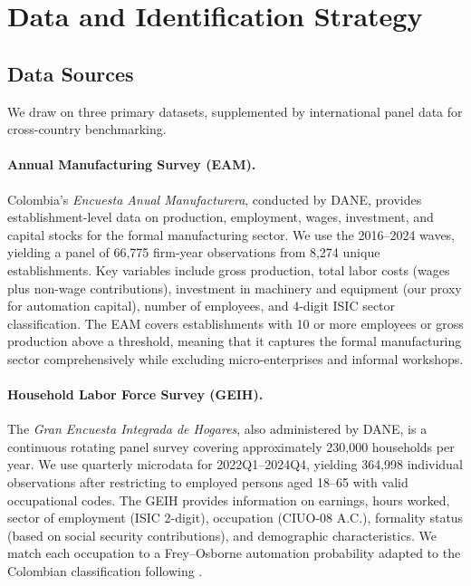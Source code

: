 \documentclass[5p,times,authoryear]{elsarticle}
\begin{document}
\section{Data and Identification Strategy}
\label{sec:data}

\subsection{Data Sources}
\label{subsec:data_sources}

We draw on three primary datasets, supplemented by international panel data for cross-country benchmarking.

\paragraph{Annual Manufacturing Survey (EAM).} Colombia's \textit{Encuesta Anual Manufacturera}, conducted by DANE, provides establishment-level data on production, employment, wages, investment, and capital stocks for the formal manufacturing sector. We use the 2016--2024 waves, yielding a panel of 66,775 firm-year observations from 8,274 unique establishments. Key variables include gross production, total labor costs (wages plus non-wage contributions), investment in machinery and equipment (our proxy for automation capital), number of employees, and 4-digit ISIC sector classification. The EAM covers establishments with 10 or more employees or gross production above a threshold, meaning that it captures the formal manufacturing sector comprehensively while excluding micro-enterprises and informal workshops.

\paragraph{Household Labor Force Survey (GEIH).} The \textit{Gran Encuesta Integrada de Hogares}, also administered by DANE, is a continuous rotating panel survey covering approximately 230,000 households per year. We use quarterly microdata for 2022Q1--2024Q4, yielding 364,998 individual observations after restricting to employed persons aged 18--65 with valid occupational codes. The GEIH provides information on earnings, hours worked, sector of employment (ISIC 2-digit), occupation (CIUO-08 A.C.), formality status (based on social security contributions), and demographic characteristics. We match each occupation to a Frey--Osborne automation probability adapted to the Colombian classification following \citet{morales2023risk}.
\end{document}
